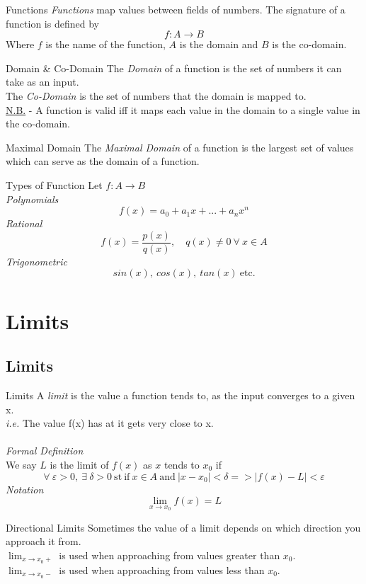 \documentclass[11pt,a4paper]{article}
\begin{document}
\subtitle{Definition 1.04 - }{Functions}
\textit{Functions} map values between fields of numbers. The signature of a function is defined by $$f : A \to B$$
Where $f$ is the name of the function, $A$ is the domain and $B$ is the co-domain. \\

\subtitle{Definition 1.05}{Domain \& Co-Domain}
The \textit{Domain} of a function is the set of numbers it can take as an input. \\
The \textit{Co-Domain} is the set of numbers that the domain is mapped to. \\

\underline{N.B.} - A function is valid iff it maps each value in the domain to a single value in the co-domain. \\

\subtitle{Definition 1.06 - }{Maximal Domain}
The \textit{Maximal Domain} of a function is the largest set of values which can serve as the domain of a function. \\

\subtitle{Remark 1.07 - }{Types of Function}
Let $f:A \to B$ \\
\textit{Polynomials} $$f(x) = a_0 + a_1x + ... +a_nx^n$$
\textit{Rational} $$f(x) = \frac{p(x)}{q(x)},\quad q(x) \not = 0\ \forall\ x \in A$$
\textit{Trigonometric} $$sin(x),\ cos(x),\ tan(x)\ \mathrm{etc.}$$

\section{Limits}
\subsection{Limits}

\subtitle{Definition 2.01 - }{Limits}
A \textit{limit} is the value a function tends to, as the input converges to a given x. \\
\textit{i.e.} The value f(x) has at it gets very close to x. \\
\\
\textit{Formal Definition}\\
We say $L$ is the limit of $f(x)$ as $x$ tends to $x_0$ if $$\forall\ \varepsilon > 0,\ \exists\ \delta > 0\ \mathrm{st\ if}\ x \in A\ \mathrm{and}\ |x - x_0| < \delta => |f(x) - L| < \varepsilon$$
\textit{Notation} $$\lim_{x \to x_0} f(x) = L$$

\subtitle{Definition 2.02 - }{Directional Limits}
Sometimes the value of a limit depends on which direction you approach it from.\\
$\lim_{x \to x_{0}+}$ is used when approaching from values greater than $x_0$. \\
$\lim_{x \to x_{0}-}$ is used when approaching from values less than $x_0$. \\
\end{document}
